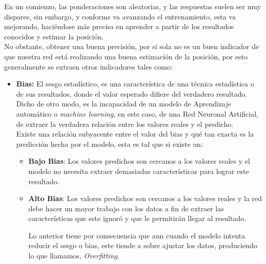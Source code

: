 \begin{itemize}
{\begin{enumerate}
\begin{enumerate}
{            En un comienzo, las ponderaciones son aleatorias, y las respuestas suelen ser muy dispares, sin embargo, y conforme va avanzando el entrenamiento, esta va mejorando, haciéndose más precisa en aprender a partir de los resultados conocidos y estimar la posición.\\
            
            No obstante, obtener una buena precisión, por si sola no es un buen indicador de que nuestra red está realizando una buena estimación de la posición, por esto generalmente se extraen otros indicadores tales como:\\
            
            \begin{itemize}
                \item{\textbf{Bias:} El sesgo estadístico, es una característica de una técnica estadística o de sus resultados, donde el valor esperado difiere del verdadero resultado.\\
                
                Dicho de otro modo, es la incapacidad de un modelo de Aprendizaje automático o \textit{machine learning}, en este caso, de una Red Neuronal Artificial, de extraer la verdadera relación entre los valores reales y el predicho.\\
                
                Existe una relación subyacente entre el valor del bias y qué tan exacta es la predicción hecha por el modelo, esta es tal que si existe un:\\
                
                \begin{itemize}
                
                    \item {\textbf{Bajo Bias}: Los valores predichos son cercanos a los valores reales y el modelo no necesita extraer demasiadas características para lograr este resultado.}
                    
                    \item {\textbf{Alto Bias}: Los valores predichos son cercanos a los valores reales y la red debe hacer un mayor trabajo con los datos a fin de extraer las características que este ignoró y que le permitirán llegar al resultado.\\}
                
                    Lo anterior tiene por consecuencia que aun cuando el modelo intenta reducir el sesgo o bias, este tiende a sobre ajustar los datos, produciendo lo que llamamos, \textit{Overfitting}.\\
                \end{itemize}
                }
            

\end{itemize}}
\end{enumerate}
\end{enumerate}}
\end{itemize}
